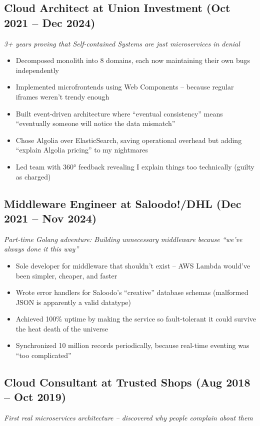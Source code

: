 \documentclass[10pt,a4paper]{article}
\begin{document}
\subsection*{Cloud Architect at Union Investment (Oct 2021 -- Dec 2024)}
\textit{3+ years proving that Self-contained Systems are just microservices in denial}

\begin{itemize}[leftmargin=*, topsep=0pt, itemsep=1pt]
\item Decomposed monolith into 8 domains, each now maintaining their own bugs independently
\item Implemented microfrontends using Web Components -- because regular iframes weren't trendy enough
\item Built event-driven architecture where ``eventual consistency'' means ``eventually someone will notice the data mismatch''
\item Chose Algolia over ElasticSearch, saving operational overhead but adding ``explain Algolia pricing'' to my nightmares
\item Led team with 360° feedback revealing I explain things too technically (guilty as charged)
\end{itemize}

\subsection*{Middleware Engineer at Saloodo!/DHL (Dec 2021 -- Nov 2024)}
\textit{Part-time Golang adventure: Building unnecessary middleware because ``we've always done it this way''}

\begin{itemize}[leftmargin=*, topsep=0pt, itemsep=1pt]
\item Sole developer for middleware that shouldn't exist -- AWS Lambda would've been simpler, cheaper, and faster
\item Wrote error handlers for Saloodo's ``creative'' database schemas (malformed JSON is apparently a valid datatype)
\item Achieved 100\% uptime by making the service so fault-tolerant it could survive the heat death of the universe
\item Synchronized 10 million records periodically, because real-time eventing was ``too complicated''
\end{itemize}

\subsection*{Cloud Consultant at Trusted Shops (Aug 2018 -- Oct 2019)}
\textit{First real microservices architecture -- discovered why people complain about them}
\end{document}
